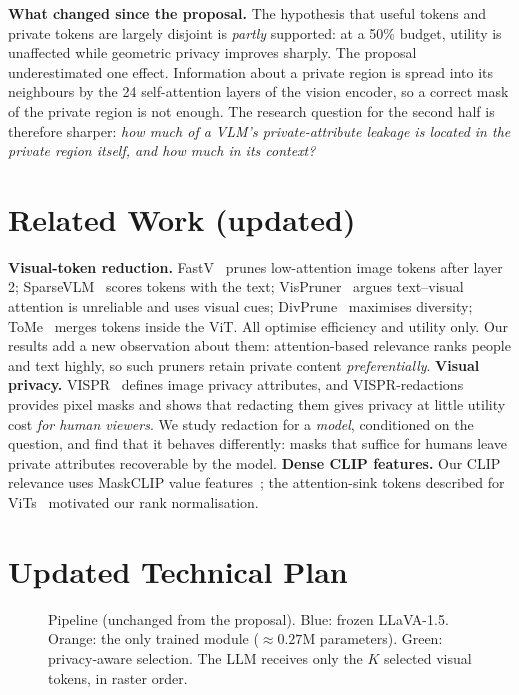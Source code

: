 \documentclass[10pt]{article}
\begin{document}
\textbf{What changed since the proposal.} The hypothesis that useful tokens and private tokens are largely disjoint is \emph{partly} supported:
at a 50\% budget, utility is unaffected while geometric privacy improves sharply. The proposal underestimated one effect. Information about
a private region is spread into its neighbours by the 24 self-attention layers of the vision encoder, so a correct mask of the private region is not enough.
The research question for the second half is therefore sharper: \emph{how much of a VLM's private-attribute leakage is located in the private region itself, and how much in its context?}

\section{Related Work (updated)}
\textbf{Visual-token reduction.} FastV~\cite{chen2024fastv} prunes low-attention image tokens after layer 2; SparseVLM~\cite{zhang2025sparsevlm} scores tokens with the text;
VisPruner~\cite{zhang2025vispruner} argues text--visual attention is unreliable and uses visual cues; DivPrune~\cite{alvar2025divprune} maximises diversity; ToMe~\cite{bolya2023tome} merges tokens inside the ViT.
All optimise efficiency and utility only. Our results add a new observation about them: attention-based relevance ranks people and text highly, so such pruners retain private content \emph{preferentially}.
\textbf{Visual privacy.} VISPR~\cite{orekondy2017vispr} defines image privacy attributes, and VISPR-redactions~\cite{orekondy2018redactions} provides pixel masks and shows that redacting them gives privacy at little utility cost \emph{for human viewers}.
We study redaction for a \emph{model}, conditioned on the question, and find that it behaves differently: masks that suffice for humans leave private attributes recoverable by the model.
\textbf{Dense CLIP features.} Our CLIP relevance uses MaskCLIP value features~\cite{zhou2022maskclip}; the attention-sink tokens described for ViTs~\cite{darcet2024registers} motivated our rank normalisation.

\section{Updated Technical Plan}
\begin{figure}[t]
\centering
\resizebox{0.92\linewidth}{!}{%
}
\caption{Pipeline (unchanged from the proposal). Blue: frozen LLaVA-1.5. Orange: the only trained module (${\approx}0.27$M parameters). Green: privacy-aware selection.
The LLM receives only the $K$ selected visual tokens, in raster order.}
\label{fig:arch}
\vspace{-0.5em}
\end{figure}
\end{document}
